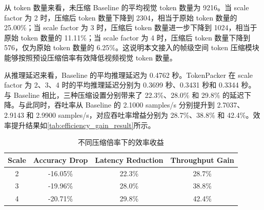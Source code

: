 \begin{table}[!htbp]
    \centering
    \small
    \caption{\label{tab:compression_efficiency_result}压缩效率实验结果}
\end{table}

从 token 数量来看，未压缩 Baseline 的平均视觉 token 数量为 9216。当 scale factor 为 2 时，压缩后 token 数量下降到 2304，相当于原始 token 数量的 25.00\%；当 scale factor 为 3 时，压缩后 token 数量进一步下降到 1024，相当于原始 token 数量的 11.11\%；当 scale factor 为 4 时，压缩后 token 数量下降到 576，仅为原始 token 数量的 6.25\%。这说明本文接入的帧级空间 token 压缩模块能够按照预设压缩倍率有效降低视频视觉 token 数量。

从推理延迟来看，Baseline 的平均推理延迟为 0.4762 秒。TokenPacker 在 scale factor 为 2、3、4 时的平均推理延迟分别为 0.3699 秒、0.3431 秒和 0.3344 秒。与 Baseline 相比，三种压缩设置分别带来了 22.3\%、28.0\% 和 29.8\% 的延迟下降。与此同时，吞吐率从 Baseline 的 2.1000 samples/s 分别提升到 2.7037、2.9143 和 2.9900 samples/s，对应吞吐率增益分别为 28.7\%、38.8\% 和 42.4\%。效率提升结果如\autoref{tab:efficiency_gain_result}所示。

\begin{table}[!htbp]
    \centering
    \caption{\label{tab:efficiency_gain_result}不同压缩倍率下的效率收益}
    \begin{tabular}{c c c c}
        \toprule
        Scale & Accuracy Drop & Latency Reduction & Throughput Gain \\
        \midrule
        2 & -16.05\% & 22.3\% & 28.7\% \\
        3 & -19.96\% & 28.0\% & 38.8\% \\
        4 & -20.71\% & 29.8\% & 42.4\% \\
        \bottomrule
    \end{tabular}
\end{table}

